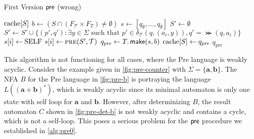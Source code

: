 \begin{algorithm}
\caption{First Version $\operatorname{\textsf{pre}}$ (wrong)}\label{alg:pre0}
\begin{algorithmic}[1]
\If{$\cache[S]$}		
\Return $\cache[S]$		
\EndIf
\State $b \gets (S \cap (F_{\mathcal{T}} \times F_{T} ) \neq \emptyset)$ 
\State $s \gets [q_{\emptyset},\dots,q_{\emptyset}]$
\State $S' \gets \emptyset$ 	%
\State $S' \gets S' \cup \{(p',q'): \exists y \in \Sigma \text{ such that } p' \in \delta_{\mathcal{T}}(q,(a_{i},y)), q' = \Succ(q,a_{i})\}$
\EndFor
{}	
\State $s[i] \gets \mathrm{SELF}$	
\Else
\State $s[i] \gets \Call{pre}{S',\mathcal{T}}$	
\EndIf
\EndFor
\State $q_{\text{pre}} \gets T.\operatorname{\textsf{make}}(s,b)$	
\State $\mathrm{cache}[S] \gets q_{\text{pre}}$		
\Return $q_{\text{pre}} $
\EndProcedure
\end{algorithmic}
\end{algorithm}

This algorithm is not functioning for all cases, where the Pre language is weakly acyclic. Consider the example given in \autoref{fig:pre-counter} with $\Sigma = \{\bm{a},\bm{b}\}$. The NFA $B$ for the Pre language in \autoref{fig:pre-b} is portraying the language $L(\bm{(a+b)^{*}})$, which is weakly acyclic since its minimal automaton is only one state with self loop for $\bm{a}$ and $\bm{b}$. However, after determinizing $B$, the result automaton $C$ shown in \autoref{fig:pre-det-b} is not weakly acyclic and contains a cycle, which is not a self-loop. This poses a serious problem for the $\operatorname{\textsf{pre}}$ procedure we established in \autoref{alg:pre0}.

